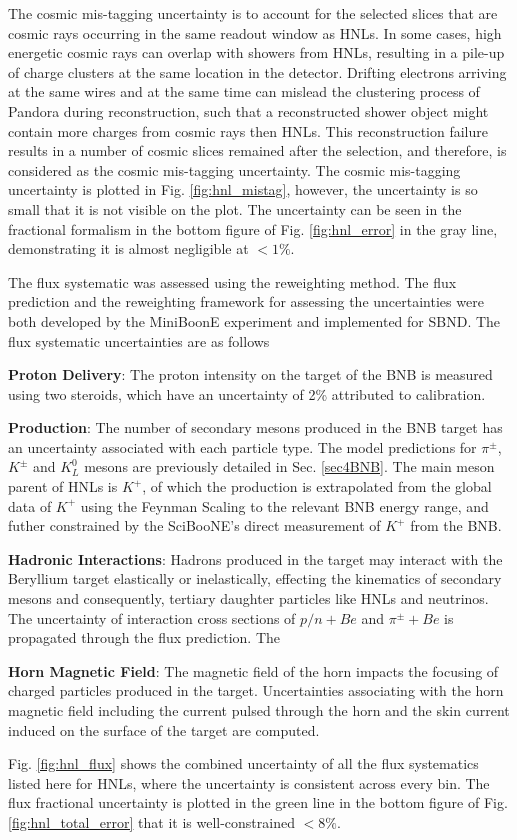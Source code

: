 The cosmic mis-tagging uncertainty is to account for the selected slices that are cosmic rays occurring in the same readout window as HNLs.
In some cases, high energetic cosmic rays can overlap with showers from HNLs, resulting in a pile-up of charge clusters at the same location in the detector.
Drifting electrons arriving at the same wires and at the same time can mislead the clustering process of Pandora during reconstruction, such that a reconstructed shower object might contain more charges from cosmic rays then HNLs.
This reconstruction failure results in a number of cosmic slices remained after the selection, and therefore, is considered as the cosmic mis-tagging uncertainty.
The cosmic mis-tagging uncertainty is plotted in Fig. \ref{fig:hnl_mistag}, however, the uncertainty is so small that it is not visible on the plot.
The uncertainty can be seen in the fractional formalism in the bottom figure of Fig. \ref{fig:hnl_error} in the gray line, demonstrating it is almost negligible at $< 1\%$. 

The flux systematic was assessed using the reweighting method.
The flux prediction and the reweighting framework for assessing the uncertainties were both developed by the MiniBoonE experiment and implemented for SBND.
The flux systematic uncertainties are as follows
\begin{coloritemize}
	\item \textbf{Proton Delivery}: The proton intensity on the target of the BNB is measured using two steroids, which have an uncertainty of 2\% attributed to calibration.
	\item \textbf{Production}: The number of secondary mesons produced in the BNB target has an uncertainty associated with each particle type. 
		The model predictions for $\pi^\pm$, $K^\pm$ and $K^0_L$ mesons are previously detailed in Sec. \ref{sec4BNB}.
		The main meson parent of HNLs is $K^+$, of which the production is extrapolated from the global data of $K^+$ using the Feynman Scaling to the relevant BNB energy range, and futher constrained by the SciBooNE's direct measurement of $K^+$ from the BNB.
	\item \textbf{Hadronic Interactions}: Hadrons produced in the target may interact with the Beryllium target elastically or inelastically, effecting the kinematics of secondary mesons and consequently, tertiary daughter particles like HNLs and neutrinos.
		The uncertainty of interaction cross sections of $p/n + Be$ and $\pi^\pm + Be$ is propagated through the flux prediction.
		The
	\item \textbf{Horn Magnetic Field}: The magnetic field of the horn impacts the focusing of charged particles produced in the target.
		Uncertainties associating with the horn magnetic field including the current pulsed through the horn and the skin current induced on the surface of the target are computed.
\end{coloritemize}
Fig. \ref{fig:hnl_flux} shows the combined uncertainty of all the flux systematics listed here for HNLs, where the uncertainty is consistent across every bin.
The flux fractional uncertainty is plotted in the green line in the bottom figure of Fig. \ref{fig:hnl_total_error} that it is well-constrained $< 8\%$.

